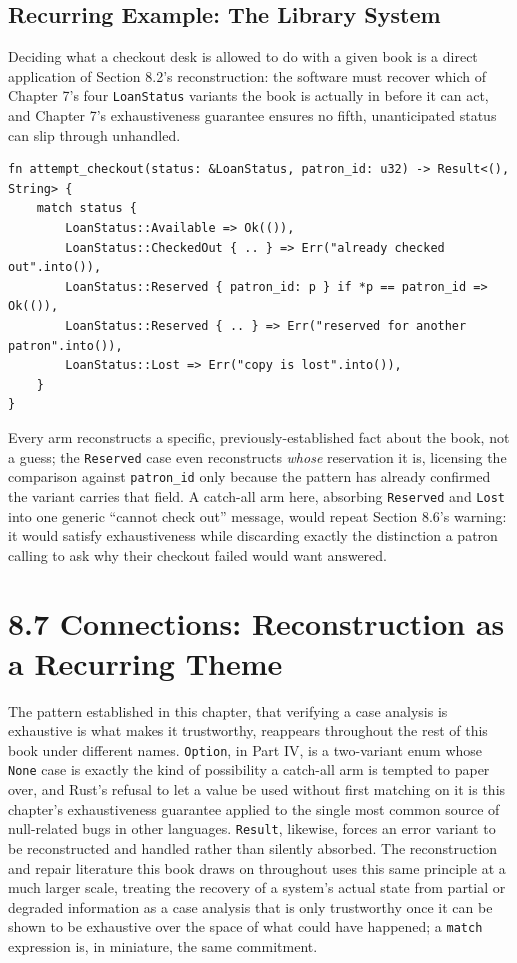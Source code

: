 \documentclass[11pt]{book}
\begin{document}
\subsection*{Recurring Example: The Library System}

Deciding what a checkout desk is allowed to do with a given book is a direct application of Section 8.2's reconstruction: the software must recover which of Chapter 7's four \texttt{LoanStatus} variants the book is actually in before it can act, and Chapter 7's exhaustiveness guarantee ensures no fifth, unanticipated status can slip through unhandled.

\begin{lstlisting}
fn attempt_checkout(status: &LoanStatus, patron_id: u32) -> Result<(), String> {
    match status {
        LoanStatus::Available => Ok(()),
        LoanStatus::CheckedOut { .. } => Err("already checked out".into()),
        LoanStatus::Reserved { patron_id: p } if *p == patron_id => Ok(()),
        LoanStatus::Reserved { .. } => Err("reserved for another patron".into()),
        LoanStatus::Lost => Err("copy is lost".into()),
    }
}
\end{lstlisting}

Every arm reconstructs a specific, previously-established fact about the book, not a guess; the \texttt{Reserved} case even reconstructs \emph{whose} reservation it is, licensing the comparison against \texttt{patron\_id} only because the pattern has already confirmed the variant carries that field. A catch-all arm here, absorbing \texttt{Reserved} and \texttt{Lost} into one generic ``cannot check out'' message, would repeat Section 8.6's warning: it would satisfy exhaustiveness while discarding exactly the distinction a patron calling to ask why their checkout failed would want answered.

\section*{8.7 Connections: Reconstruction as a Recurring Theme}

The pattern established in this chapter, that verifying a case analysis is exhaustive is what makes it trustworthy, reappears throughout the rest of this book under different names. \texttt{Option}, in Part IV, is a two-variant enum whose \texttt{None} case is exactly the kind of possibility a catch-all arm is tempted to paper over, and Rust's refusal to let a value be used without first matching on it is this chapter's exhaustiveness guarantee applied to the single most common source of null-related bugs in other languages. \texttt{Result}, likewise, forces an error variant to be reconstructed and handled rather than silently absorbed. The reconstruction and repair literature this book draws on throughout uses this same principle at a much larger scale, treating the recovery of a system's actual state from partial or degraded information as a case analysis that is only trustworthy once it can be shown to be exhaustive over the space of what could have happened; a \texttt{match} expression is, in miniature, the same commitment.
\end{document}

